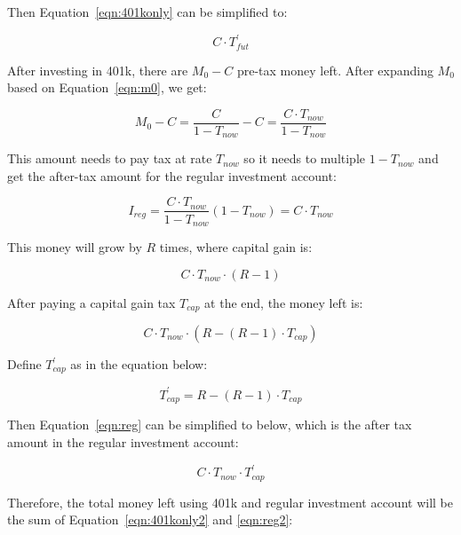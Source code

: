 \documentclass[twocolumn]{article}
\begin{document}
Then Equation~\ref{eqn:401konly} can be simplified to:

\begin{equation}
  C \cdot T_{fut}^{\prime} \label{eqn:401konly2}
\end{equation}

After investing in 401k, there are $M_{0} - C$ pre-tax money left. After
expanding $M_{0}$ based on Equation~\ref{eqn:m0}, we get:

\begin{equation}
  M_{0} - C = \frac{C}{1 - T_{now}} - C = \frac{C \cdot T_{now}}{1 - T_{now}} \label{eqn:m4}
\end{equation}

This amount needs to pay tax at rate $T_{now}$ so it needs to multiple
$1-T_{now}$ and get the after-tax amount for the regular investment account:

\begin{equation}
  I_{reg} = \frac{C \cdot T_{now}}{1 - T_{now}} (1 - T_{now}) = C \cdot T_{now} \label{eqn:reg0}
\end{equation}

This money will grow by $R$ times, where capital gain is:

\begin{equation}
  C \cdot T_{now} \cdot (R - 1) \label{eqn:reg-before-gain}
\end{equation}

After paying a capital gain tax $T_{cap}$ at the end, the money left is:

\begin{equation}
  C \cdot T_{now} \cdot (R - (R - 1) \cdot T_{cap}) \label{eqn:reg}
\end{equation}

Define $T_{cap}^{\prime}$ as in the equation below:

\begin{equation}
  T_{cap}^{\prime} = R - (R - 1) \cdot T_{cap} \label{eqn:capp}
\end{equation}

Then Equation~\ref{eqn:reg} can be simplified to below, which is the after tax amount in the regular investment account:

\begin{equation}
  C \cdot T_{now} \cdot T_{cap}^{\prime} \label{eqn:reg2}
\end{equation}

Therefore, the total money left using 401k and regular investment account will
be the sum of Equation~\ref{eqn:401konly2} and \ref{eqn:reg2}:
\end{document}
